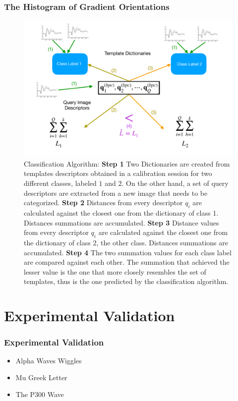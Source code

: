 \documentclass[aspectratio=169]{beamer}
\begin{document}
\begin{frame}
\frametitle{The Histogram of Gradient Orientations}
\begin{center}
\begin{figure}[h!]
\centering
\includegraphics[scale=0.4]{images/ClassificationFull.pdf}
\caption[NBNN Classification]{Classification Algorithm: \textbf{Step 1} Two Dictionaries are created from templates descriptors obtained in a calibration session for two different classes, labeled $1$ and $2$. On the other hand, a set of query descriptors are extracted from a new image that needs to be categorized. \textbf{Step 2} Distances from every descriptor $q_i$ are calculated against the closest one from the dictionary of class 1.  Distances summations are accumulated. \textbf{Step 3} Distance values from every descriptor $q_i$ are calculated against the closest one from the dictionary of class 2, the other class.  Distances summations are accumulated. \textbf{Step 4 }The two summation values for each class label are compared against each other. The summation that achieved the lesser value is the one that more closely resembles the set of templates, thus is the one predicted by the classification algorithm.}
\label{fig:nbnnclassification}
\end{figure}
\end{center}
\end{frame}   

\section{Experimental Validation}
\begin{frame}
\frametitle{Experimental Validation}
\begin{center}
\begin{itemize}
 \item<1-> Alpha Waves Wiggles
 \item<2-> Mu Greek Letter
 \item<3-> The P300 Wave
\end{itemize}
\end{center}
\end{frame}     
\end{document}
